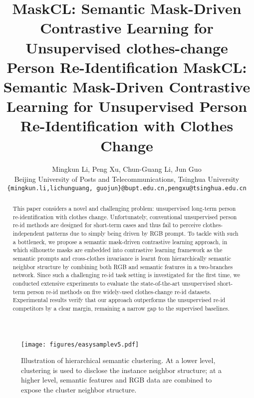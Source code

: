 \documentclass[10pt,twocolumn,letterpaper]{article}
\newcommand{\reid}{re-id}
\newcommand{\sota}{the state-of-the-art}
\begin{document}
\title{ MaskCL: Semantic Mask-Driven Contrastive Learning for Unsupervised clothes-change Person Re-Identification}
\title{ MaskCL: Semantic Mask-Driven Contrastive Learning for Unsupervised Person Re-Identification with Clothes Change}









\author{
    Mingkun Li, Peng Xu, Chun-Guang Li, Jun Guo \\
    Beijing University of Posts and Telecommunications,
    Tsinghua University\\
    {\tt\small \{mingkun.li,lichunguang, guojun\}@bupt.edu.cn,pengxu@tsinghua.edu.cn}
}
\maketitle
\ificcvfinal\thispagestyle{empty}\fi 


\begin{abstract}






This paper considers a novel and challenging problem: unsupervised long-term person re-identification with clothes change. Unfortunately, conventional unsupervised person re-id methods are designed for short-term cases and thus fail to perceive clothes-independent patterns due to simply being driven by RGB prompt. To tackle with such a bottleneck, we propose a semantic mask-driven contrastive learning approach, in which silhouette masks are embedded into contrastive learning framework as the semantic prompts and cross-clothes invariance is learnt from hierarchically semantic neighbor structure by combining both RGB and semantic features in a two-branches network. 
{Since such a challenging re-id task setting is investigated for the first time, we conducted extensive experiments to evaluate \sota{} unsupervised short-term person re-id methods on five widely-used clothes-change \reid{} datasets.}
Experimental results verify that our approach outperforms the unsupervised \reid{} competitors by a clear margin, remaining a narrow gap to the supervised baselines. 

\end{abstract}






\begin{figure}[t]
\begin{center}
\texttt{[image: figures/easysamplev5.pdf]}
\end{center}
\vspace{-15pt}
   \caption{Illustration of hierarchical semantic clustering. At a lower level, clustering is used to disclose the instance neighbor structure; at a higher level, semantic features and RGB data are combined to expose the cluster neighbor structure.}
\label{fig:semantic_test}
\vspace{-15pt}
\end{figure}
\end{document}
